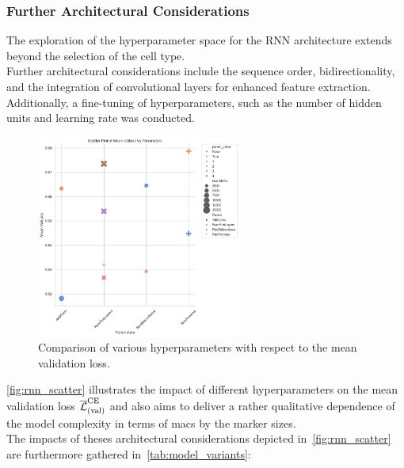 \subsubsection{Further Architectural Considerations}

The exploration of the hyperparameter space for the RNN architecture extends beyond the selection of the cell type.\\
Further architectural considerations include the sequence order, bidirectionality, and the integration of convolutional
layers for enhanced feature extraction.\\
Additionally, a fine-tuning of hyperparameters, such as the number of hidden units and learning rate was conducted. \\


\begin{figure}[H]
    \centering
    \includegraphics[width=0.6\textwidth]{figures/06_ModelExploration/RNN/rnn_scatter.png}
    \caption{Comparison of various hyperparameters with respect to the mean validation loss.}
    \label{fig:rnn_scatter}
\end{figure}

\autoref{fig:rnn_scatter} illustrates the impact of different hyperparameters on the mean validation loss \( \overline{\mathcal{L}}_{(\text{val})}^{\text{CE}} \) and
also aims to deliver a rather qualitative dependence of the model complexity in terms of \glspl{mac} by the marker sizes.\\
The impacts of theses architectural considerations depicted in~\autoref{fig:rnn_scatter} are furthermore gathered in~\autoref{tab:model_variants}:

